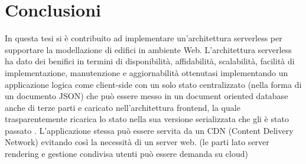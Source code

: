 \section{Conclusioni}
\label{sec:conclusions_section_1}

In questa tesi si è contribuito ad implementare un'architettura serverless per supportare la modellazione di edifici
in ambiente Web. L'architettura serverless ha dato dei benifici in termini di disponibilità, affidabilità,  scalabilità,
facilità di implementazione, manutenzione e aggiornabilità ottenutasi implementando un applicazione logica
come client-side con un solo stato centralizzato (nella forma di un documento JSON) che può essere messo in un
document oriented database anche di terze parti e caricato nell'architettura frontend, la quale
 trasparentemente ricarica lo stato nella sua versione serializzata che gli è stato passato .
 L'applicazione stessa può essere servita da un CDN (Content Delivery Network) evitando così la necessità di un server web.
(le parti lato server rendering e gestione condivisa utenti può essere demanda su cloud)
